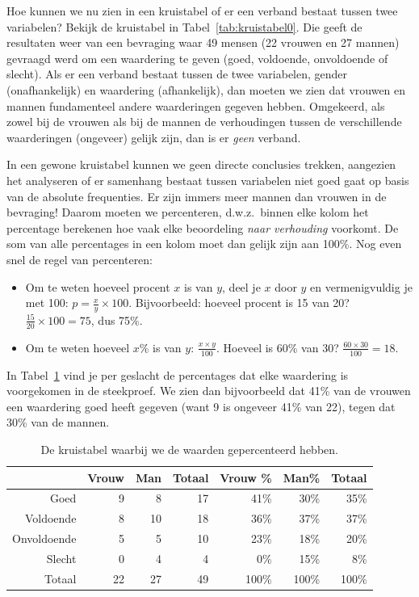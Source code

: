Hoe kunnen we nu zien in een kruistabel of er een verband bestaat tussen twee variabelen? Bekijk de kruistabel in Tabel~\ref{tab:kruistabel0}. Die geeft de resultaten weer van een bevraging waar 49 mensen (22 vrouwen en 27 mannen) gevraagd werd om een waardering te geven (goed, voldoende, onvoldoende of slecht). Als er een verband bestaat tussen de twee variabelen, gender (onafhankelijk) en waardering (afhankelijk), dan moeten we zien dat vrouwen en mannen fundamenteel andere waarderingen gegeven hebben. Omgekeerd, als zowel bij de vrouwen als bij de mannen de verhoudingen tussen de verschillende waarderingen (ongeveer) gelijk zijn, dan is er \emph{geen} verband.

In een gewone kruistabel kunnen we geen directe conclusies trekken, aangezien het analyseren of er samenhang bestaat tussen variabelen niet goed gaat op basis van de absolute frequenties. Er zijn immers meer mannen dan vrouwen in de bevraging! Daarom moeten we percenteren, d.w.z.~binnen elke kolom het percentage berekenen hoe vaak elke beoordeling \emph{naar verhouding} voorkomt. De som van alle percentages in een kolom moet dan gelijk zijn aan 100\%. Nog even snel de regel van percenteren:

\begin{itemize}
  \item Om te weten hoeveel procent $x$ is van $y$, deel je $x$ door $y$ en vermenigvuldig je met 100: $p = \frac{x}{y} \times 100$. Bijvoorbeeld: hoeveel procent is 15 van 20? $\frac{15}{20} \times 100 = 75$, dus 75\%.
  \item Om te weten hoeveel $x\%$ is van $y$: $\frac{x \times y}{100}$. Hoeveel is 60\% van 30? $\frac{60 \times 30}{100} = 18$.
\end{itemize}

In Tabel~\ref{tab:kruistabel1} vind je per geslacht de percentages dat elke waardering is voorgekomen in de steekproef. We zien dan bijvoorbeeld dat 41\% van de vrouwen een waardering goed heeft gegeven (want 9 is ongeveer 41\% van 22), tegen dat 30\% van de mannen.

\begin{table} \centering
  \begin{tabular}{@{}rrrrrrr@{}}
  	\toprule
  	            & Vrouw & Man & Totaal & Vrouw \% & Man\% & Totaal \\
  	\midrule
  	       Goed &     9 &   8 &     17 &     41\% &  30\% &   35\% \\
  	  Voldoende &     8 &  10 &     18 &     36\% &  37\% &   37\% \\
  	Onvoldoende &     5 &   5 &     10 &     23\% &  18\% &   20\% \\
  	     Slecht &     0 &   4 &      4 &      0\% &  15\% &    8\% \\
  	     Totaal &    22 &  27 &     49 &    100\% & 100\% &  100\% \\
  	\bottomrule
  \end{tabular}
  \caption{De kruistabel waarbij we de waarden gepercenteerd hebben.}
  \label{tab:kruistabel1}
\end{table}

